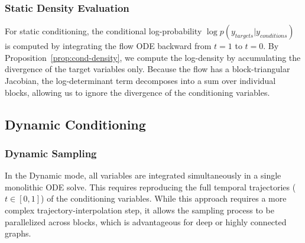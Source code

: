 \subsubsection{Static Density Evaluation}

For static conditioning, the conditional log-probability $\log p(y_{targets} | y_{conditions})$ is computed by integrating the flow ODE backward from $t=1$ to $t=0$. By Proposition~\ref{prop:cond-density}, we compute the log-density by accumulating the divergence of the target variables only. Because the flow has a block-triangular Jacobian, the log-determinant term decomposes into a sum over individual blocks, allowing us to ignore the divergence of the conditioning variables.

\subsection{Dynamic Conditioning}

\subsubsection{Dynamic Sampling}

In the Dynamic mode, all variables are integrated simultaneously in a single monolithic ODE solve. This requires reproducing the full temporal trajectories ($t \in [0, 1]$) of the conditioning variables. While this approach requires a more complex trajectory-interpolation step, it allows the sampling process to be parallelized across blocks, which is advantageous for deep or highly connected graphs.

